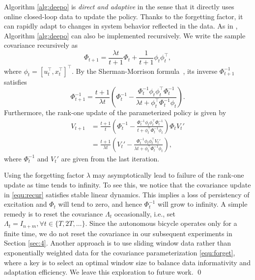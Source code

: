 Algorithm \ref{alg:deepo} is \textit{direct and adaptive} in the sense that it directly uses online closed-loop data to update the policy. Thanks to the forgetting factor, it can rapidly adapt to changes in system behavior reflected in the data. 
As in \cite{zhao2024data}, Algorithm \ref{alg:deepo} can also be implemented recursively. We write the sample covariance  recursively as
\begin{equation}\label{equ:recur}
    \Phi_{t+1} = \frac{\lambda t}{t+1} \Phi_{t} + \frac{1}{t+1} \phi_t\phi_t^{\top},
\end{equation}
where $\phi_t = [u_t^\top, x_t^\top]^\top$. By the Sherman-Morrison formula~\cite{sherman1950adjustment}, its inverse $\Phi_{t+1}^{-1}$ satisfies
\begin{equation}
    \Phi_{t+1}^{-1} = \frac{t+1}{\lambda t}\left(\Phi_{t}^{-1} - \frac{\Phi_{t}^{-1}\phi_t\phi_t^{\top}\Phi_{t}^{-1}}{\lambda t+\phi_t^{\top}\Phi_{t}^{-1}\phi_t}\right).
\end{equation}
Furthermore, the rank-one update of the parameterized policy is given by
\begin{align}
V_{t+1}&= \frac{t+1}{t}\left(\Phi_{t}^{-1} - \frac{\Phi_{t}^{-1}\phi_t\phi_t^{\top}\Phi_{t}^{-1}}{t+\phi_t^{\top}\Phi_{t}^{-1}\phi_t}\right) \Phi_{t} V_{t}' \nonumber \\ 
&= \frac{t+1}{\lambda t} \left(V_{t}' - \frac{\Phi_{t}^{-1}\phi_t\phi_t^{\top}V_{t}'}{\lambda t+\phi_t^{\top}\Phi_{t}^{-1}\phi_t}\right),
\end{align}
where $\Phi_{t}^{-1}$ and $V_{t}'$ are given from the last iteration.

\begin{remark}
Using the forgetting factor $\lambda$ may asymptotically lead to failure of the rank-one update as time tends to infinity. To see this, we notice that the covariance update in
\eqref{equ:recur} satisfies stable linear dynamics. This implies a loss of persistency of excitation and $\Phi_t$ will tend to zero, and hence $\Phi^{-1}_t$ will grow to infinity. A simple remedy is to reset the covariance $\Lambda_{t}$  occasionally, i.e., set $\Lambda_{t}=I_{n+m}, \forall t\in \{T,2T,\dots\}$. Since the autonomous bicycle operates only for a finite time, we do not reset the covariance in our subsequent experiments in Section \ref{sec:4}. Another approach is to use sliding window data rather than exponentially weighted data for the covariance parameterization \eqref{equ:forget}, where a key is to select an optimal window size to balance data informativity and adaptation efficiency. We leave this exploration to future work.
\qed
\end{remark}

